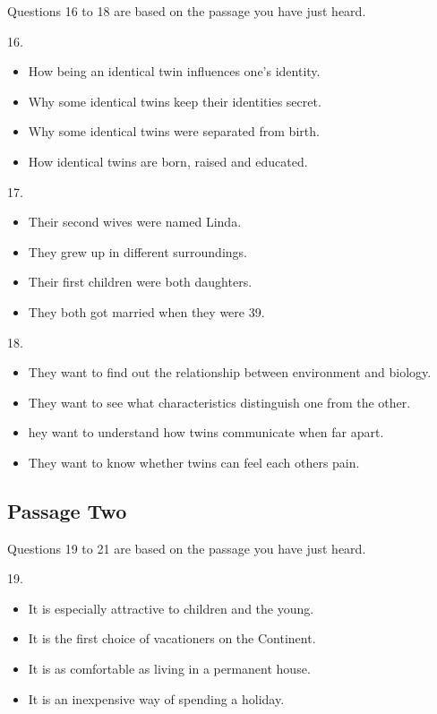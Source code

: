 \documentclass[UTF8,11pt]{ctexart}
\begin{document}
Questions 16 to 18 are based on the passage you have just heard.


16.


\begin{itemize}[leftmargin=2em,itemsep=.2em,topsep=.4em]\item[A.] How being an identical twin influences one’s identity.
\item[B.] Why some identical twins keep their identities secret.
\item[C.] Why some identical twins were separated from birth.
\item[D.] How identical twins are born, raised and educated.
\end{itemize}

17.


\begin{itemize}[leftmargin=2em,itemsep=.2em,topsep=.4em]\item[A.] Their second wives were named Linda.
\item[B.] They grew up in different surroundings.
\item[C.] Their first children were both daughters.
\item[D.] They both got married when they were 39.
\end{itemize}

18.


\begin{itemize}[leftmargin=2em,itemsep=.2em,topsep=.4em]\item[A.] They want to find out the relationship between environment and biology.
\item[B.] They want to see what characteristics distinguish one from the other.
\item[C.] hey want to understand how twins communicate when far apart.
\item[D.] They want to know whether twins can feel each others pain.
\end{itemize}

\subsection*{Passage Two}


Questions 19 to 21 are based on the passage you have just heard.


19.


\begin{itemize}[leftmargin=2em,itemsep=.2em,topsep=.4em]\item[A.] It is especially attractive to children and the young.
\item[B.] It is the first choice of vacationers on the Continent.
\item[C.] It is as comfortable as living in a permanent house.
\item[D.] It is an inexpensive way of spending a holiday.
\end{itemize}
\end{document}
